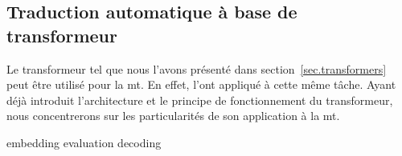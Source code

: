 \subsection{Traduction automatique à base de transformeur}
\label{subsec.nmt-transformer}

Le transformeur tel que nous l'avons présenté dans section~\ref{sec.transformers}
peut être utilisé pour la \gls{mt}.
En effet, \cite{attention} l'ont appliqué à cette même tâche.
Ayant déjà introduit l'architecture et le principe de fonctionnement du transformeur,
nous concentrerons sur les particularités de son application à la \gls{mt}.

{embedding}
{evaluation}
{decoding}